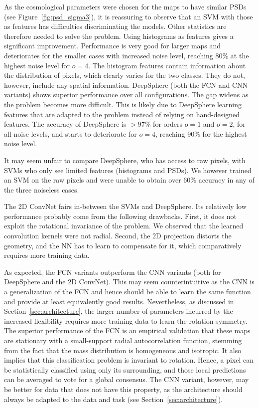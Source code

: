 \documentclass[final,twocolumn,3p,times,sort&compress]{elsarticle}
\newcommand{\figref}[1]{Figure~\ref{fig:#1}}
\newcommand{\secref}[1]{Section~\ref{sec:#1}}
\newcommand{\1}{\b{1}}              %
\newcommand{\0}{\b{0}}              %
\begin{document}
As the cosmological parameters were chosen for the maps to have similar PSDs (see \figref{psd_sigma3}), it is reassuring to observe that an SVM with those as features has difficulties discriminating the models.
Other statistics are therefore needed to solve the problem. Using histograms as features gives a significant improvement.
Performance is very good for larger maps and deteriorates for the smaller cases with increased noise level, reaching 80\% at the highest noise level for $o=4$.
The histogram features contain information about the distribution of pixels, which clearly varies for the two classes.
They do not, however, include any spatial information.
DeepSphere (both the FCN and CNN variants) shows superior performance over all configurations.
The gap widens as the problem becomes more difficult.
This is likely due to DeepSphere learning features that are adapted to the problem instead of relying on hand-designed features.
The accuracy of DeepSphere is $>97\%$ for orders $o=1$ and $o=2$, for all noise levels, and starts to deteriorate for $o=4$, reaching 90\% for the highest noise level.

It may seem unfair to compare DeepSphere, who has access to raw pixels, with SVMs who only see limited features (histograms and PSDs).
We however trained an SVM on the raw pixels and were unable to obtain over $60\%$ accuracy in any of the three noiseless cases.

The 2D ConvNet fairs in-between the SVMs and DeepSphere.
Its relatively low performance probably come from the following drawbacks.
First, it does not exploit the rotational invariance of the problem.
We observed that the learned convolution kernels were not radial.
Second, the 2D projection distorts the geometry, and the NN has to learn to compensate for it, which comparatively requires more training data.

As expected, the FCN variants outperform the CNN variants (both for DeepSphere and the 2D ConvNet).
This may seem counterintuitive as the CNN is a generalization of the FCN and hence should be able to learn the same function and provide at least equivalently good results.
Nevertheless, as discussed in \secref{architecture}, the larger number of parameters incurred by the increased flexibility requires more training data to learn the rotation symmetry.
The superior performance of the FCN is an empirical validation that these maps are stationary with a small-support radial autocorrelation function, stemming from the fact that the mass distribution is homogeneous and isotropic.
It also implies that this classification problem is invariant to rotation.
Hence, a pixel can be statistically classified using only its surrounding, and those local predictions can be averaged to vote for a global consensus.
The CNN variant, however, may be better for data that does not have this property, as the architecture should always be adapted to the data and task (see \secref{architecture}).
\end{document}
